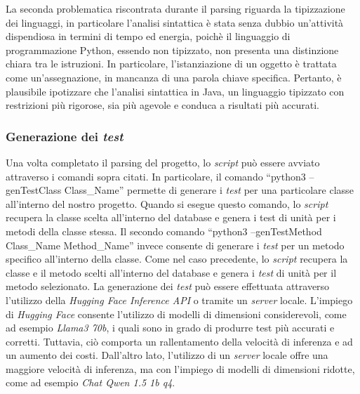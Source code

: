     La seconda problematica riscontrata durante il parsing riguarda la tipizzazione dei linguaggi, in particolare l'analisi sintattica è stata senza dubbio un'attività dispendiosa in termini di tempo ed energia, poichè il linguaggio di programmazione Python, essendo non tipizzato, non presenta una distinzione chiara tra le istruzioni. In particolare, l'istanziazione di un oggetto è trattata come un'assegnazione, in mancanza di una parola chiave specifica. Pertanto, è plausibile ipotizzare che l'analisi sintattica in Java, un linguaggio tipizzato con restrizioni più rigorose, sia più agevole e conduca a risultati più accurati.
    
    \subsubsection{Generazione dei \textit{test}}
    Una volta completato il parsing del progetto, lo \textit{script} può essere avviato attraverso i comandi sopra citati.
    In particolare, il comando “python3 --genTestClass Class\_Name” permette di generare i \textit{test} per una particolare classe all'interno del nostro progetto.
    Quando si esegue questo comando, lo \textit{script} recupera la classe scelta all'interno del database e genera i test di unità per i metodi della classe stessa.
    Il secondo comando “python3 --genTestMethod Class\_Name Method\_Name” invece consente di generare i \textit{test} per un metodo specifico all'interno della classe.
    Come nel caso precedente, lo \textit{script} recupera la classe e il metodo scelti all'interno del database e genera i \textit{test} di unità per il metodo selezionato.
    La generazione dei \textit{test} può essere effettuata attraverso l'utilizzo della \textit{Hugging Face Inference API} o tramite un \textit{server} locale. 
    L'impiego di \textit{Hugging Face} consente l'utilizzo di modelli di dimensioni considerevoli, come ad esempio \textit{Llama3 70b}, i quali sono in grado di produrre test più accurati e corretti. Tuttavia, ciò comporta un rallentamento della velocità di inferenza e ad un aumento dei costi. 
    Dall'altro lato, l'utilizzo di un \textit{server} locale offre una maggiore velocità di inferenza, ma con l'impiego di modelli di dimensioni ridotte, come ad esempio \textit{Chat Qwen 1.5 1b q4}.

